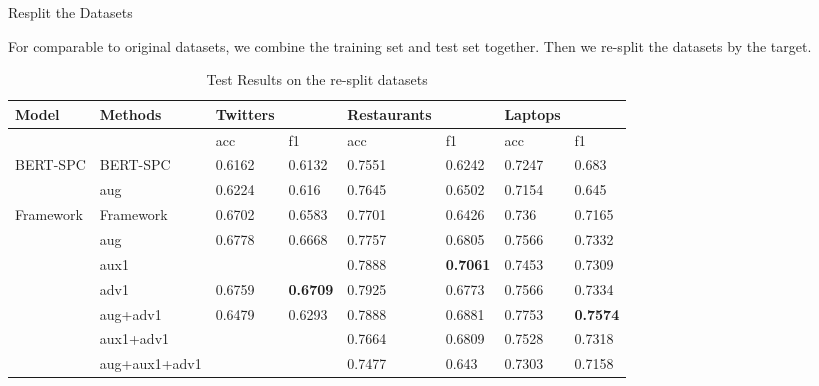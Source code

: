 \documentclass[xcolor=dvipsnames]{beamer}
\begin{document}
\begin{frame}{Resplit the Datasets}

For comparable to original datasets, we combine the training set and test set together. Then we re-split the datasets by the target.

\begin{table}[]
  \centering
  \tiny
  \caption{Test Results on the re-split datasets}
  \label{tab:my-table}
  \begin{tabular}{llllllll}
    \toprule
  Model   &Methods& Twitters &        & Restaurants &        & Laptops &        \\
  \midrule

            &               & acc      & f1     & acc         & f1     & acc     & f1     \\
  BERT-SPC  & BERT-SPC      & 0.6162   & 0.6132 & 0.7551      & 0.6242 & 0.7247  & 0.683  \\
            & aug           & 0.6224   & 0.616  & 0.7645      & 0.6502 & 0.7154  & 0.645  \\
      \midrule

  Framework & Framework     & 0.6702   & 0.6583 & 0.7701      & 0.6426 & 0.736   & 0.7165 \\
            & aug           & 0.6778   & 0.6668 & 0.7757      & 0.6805 & 0.7566  & 0.7332 \\
            & aux1          &          &        & 0.7888      & \textbf{0.7061} & 0.7453  & 0.7309 \\
            & adv1          & 0.6759   & \textbf{0.6709}& 0.7925      & 0.6773 & 0.7566  & 0.7334 \\
            & aug+adv1      & 0.6479   & 0.6293 & 0.7888      & 0.6881 & {0.7753}  & \textbf{0.7574} \\
            & aux1+adv1     &          &        & 0.7664      & 0.6809 & 0.7528  & 0.7318 \\
            & aug+aux1+adv1 &          &        & 0.7477      & 0.643  & 0.7303  & 0.7158\\
            \bottomrule
  \end{tabular}
  \end{table}

\end{frame}
\end{document}
